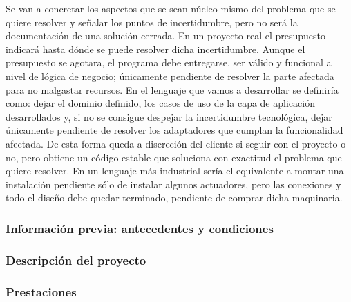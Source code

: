 Se van a concretar los aspectos que se sean núcleo mismo del problema que se quiere resolver y señalar los puntos de incertidumbre, pero no será la documentación de una solución cerrada. En un proyecto real el presupuesto indicará hasta dónde se puede resolver dicha incertidumbre. Aunque el presupuesto se agotara, el programa debe entregarse, ser válido y funcional a nivel de lógica de negocio; únicamente pendiente de resolver la parte afectada para no malgastar recursos. En el lenguaje que vamos a desarrollar se definiría como: dejar el dominio definido, los casos de uso de la capa de aplicación desarrollados y, si no se consigue despejar la incertidumbre tecnológica, dejar únicamente pendiente de resolver los adaptadores que cumplan la funcionalidad afectada. De esta forma queda a discreción del cliente si seguir con el proyecto o no, pero obtiene un código estable que soluciona con exactitud el problema que quiere resolver. En un lenguaje más industrial sería el equivalente a montar una instalación pendiente sólo de instalar algunos actuadores, pero las conexiones y todo el diseño debe quedar terminado, pendiente de comprar dicha maquinaria.

\subsubsection{Información previa: antecedentes y condiciones}
    
\subsubsection{Descripción del proyecto}
    
\subsubsection{Prestaciones}
    

